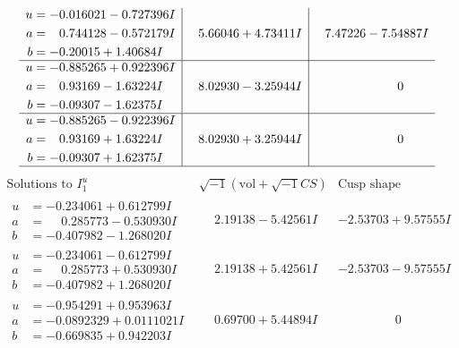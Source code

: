 \documentclass[1p]{elsarticle_modified}
\theoremstyle{definition}
\newcommand{\I}{\sqrt{-1}}
\begin{document}
$$\begin{array}{c|c|c}
\begin{aligned}
u &= -0.016021 - 0.727396 I \\
a &= \phantom{-}0.744128 - 0.572179 I \\
b &= -0.20015 + 1.40684 I\end{aligned}
 & \phantom{-}5.66046 + 4.73411 I & \phantom{-}7.47226 - 7.54887 I \\ \hline\begin{aligned}
u &= -0.885265 + 0.922396 I \\
a &= \phantom{-}0.93169 - 1.63224 I \\
b &= -0.09307 - 1.62375 I\end{aligned}
 & \phantom{-}8.02930 - 3.25944 I & \phantom{-0.000000 } 0 \\ \hline\begin{aligned}
u &= -0.885265 - 0.922396 I \\
a &= \phantom{-}0.93169 + 1.63224 I \\
b &= -0.09307 + 1.62375 I\end{aligned}
 & \phantom{-}8.02930 + 3.25944 I & \phantom{-0.000000 } 0\\
 \hline 
 \end{array}$$\newpage$$\begin{array}{c|c|c}  
\text{Solutions to }I^u_{1}& \I (\text{vol} + \sqrt{-1}CS) & \text{Cusp shape}\\
 \hline 
\begin{aligned}
u &= -0.234061 + 0.612799 I \\
a &= \phantom{-}0.285773 - 0.530930 I \\
b &= -0.407982 - 1.268020 I\end{aligned}
 & \phantom{-}2.19138 - 5.42561 I & -2.53703 + 9.57555 I \\ \hline\begin{aligned}
u &= -0.234061 - 0.612799 I \\
a &= \phantom{-}0.285773 + 0.530930 I \\
b &= -0.407982 + 1.268020 I\end{aligned}
 & \phantom{-}2.19138 + 5.42561 I & -2.53703 - 9.57555 I \\ \hline\begin{aligned}
u &= -0.954291 + 0.953963 I \\
a &= -0.0892329 + 0.0111021 I \\
b &= -0.669835 + 0.942203 I\end{aligned}
 & \phantom{-}0.69700 + 5.44894 I & \phantom{-0.000000 } 0 \\ \hline\begin{aligned}

\end{aligned}
\end{array}$$
\end{document}

